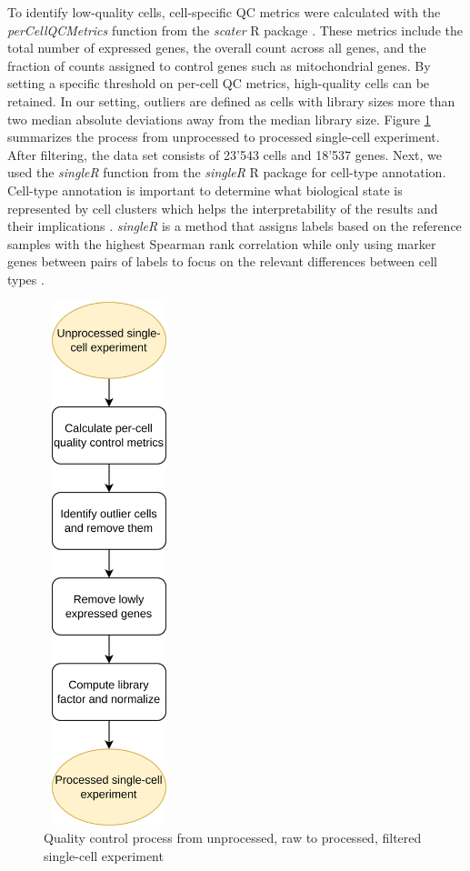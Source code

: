 To identify low-quality cells, cell-specific QC metrics were calculated with the \emph{perCellQCMetrics} function from the \emph{scater} R package \citep{scater}. These metrics include the total number of expressed genes, the overall count across all genes, and the fraction of counts assigned to control genes such as mitochondrial genes. By setting a specific threshold on per-cell QC metrics, high-quality cells can be retained. In our setting, outliers are defined as cells with library sizes more than two median absolute deviations away from the median library size. Figure \ref{fig:QC} summarizes the process from unprocessed to processed single-cell experiment. After filtering, the data set consists of 23'543 cells and 18'537 genes. Next, we used the \emph{singleR} function from the \emph{singleR} R package \citep{singleR} for cell-type annotation. Cell-type annotation is important to determine what biological state is represented by cell clusters which helps the interpretability of the results and their implications \citep{OSCA}. \emph{singleR} is a method that assigns labels based on the reference samples with the highest Spearman rank correlation while only using marker genes between pairs of labels to focus on the relevant differences between cell types \citep{singleR}.

\begin{figure}[!htb]
\begin{center}
\includegraphics[width=1.5in,height=6in]{figure/qc.png}
\end{center}
\caption{Quality control process from unprocessed, raw to processed, filtered single-cell experiment}
\label{fig:QC}
\end{figure}
\FloatBarrier

